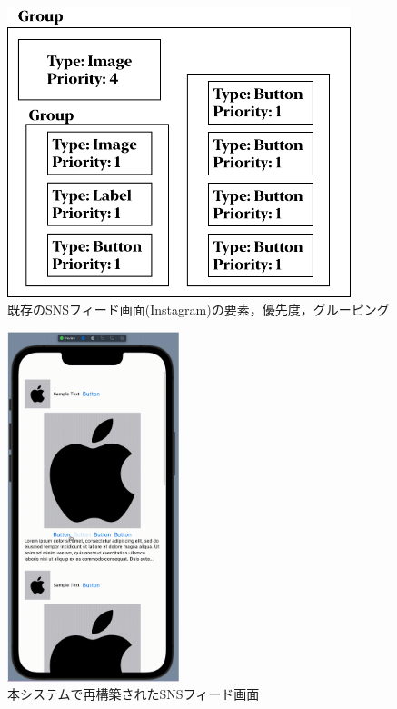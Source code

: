 \begin{figure}[htbp]
  \begin{minipage}{\hsize}
    \begin{center}
       \includegraphics[width=100mm]{img/Instagram_ViewStructure.png}
    \end{center}
    \caption{既存のSNSフィード画面(Instagram)の要素，優先度，グルーピング}
    \label{fig:instagram_ViewStructure}
  \end{minipage}
\end{figure}

\begin{figure}[htbp]
  \begin{minipage}{\hsize}
    \begin{center}
       \includegraphics[width=50mm]{img/Instagram_autogen.png}
    \end{center}
    \caption{本システムで再構築されたSNSフィード画面}
    \label{fig:instagram_autogen}
  \end{minipage}
\end{figure}

